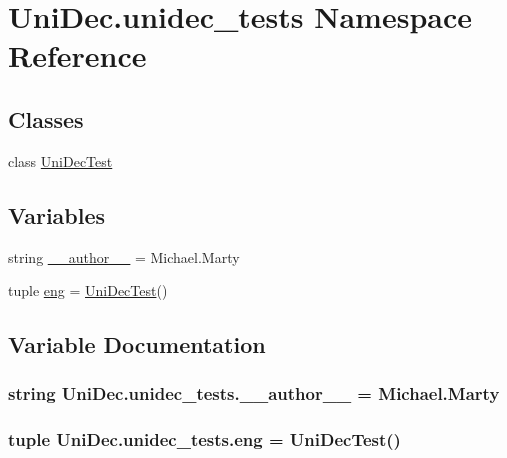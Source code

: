 \hypertarget{namespace_uni_dec_1_1unidec__tests}{}\section{Uni\+Dec.\+unidec\+\_\+tests Namespace Reference}
\label{namespace_uni_dec_1_1unidec__tests}
\subsection*{Classes}
\begin{DoxyCompactItemize}
\item 
class \hyperlink{class_uni_dec_1_1unidec__tests_1_1_uni_dec_test}{Uni\+Dec\+Test}
\end{DoxyCompactItemize}
\subsection*{Variables}
\begin{DoxyCompactItemize}
\item 
string \hyperlink{namespace_uni_dec_1_1unidec__tests_aa5af8d24527df9f71be79db84e1bf8b1}{\+\_\+\+\_\+author\+\_\+\+\_\+} = \textquotesingle{}Michael.\+Marty\textquotesingle{}
\item 
tuple \hyperlink{namespace_uni_dec_1_1unidec__tests_a3bc1a351c1c2477741d0c48d38276a52}{eng} = \hyperlink{class_uni_dec_1_1unidec__tests_1_1_uni_dec_test}{Uni\+Dec\+Test}()
\end{DoxyCompactItemize}


\subsection{Variable Documentation}
\hypertarget{namespace_uni_dec_1_1unidec__tests_aa5af8d24527df9f71be79db84e1bf8b1}{}
\subsubsection[{\+\_\+\+\_\+author\+\_\+\+\_\+}]{\setlength{\rightskip}{0pt plus 5cm}string Uni\+Dec.\+unidec\+\_\+tests.\+\_\+\+\_\+author\+\_\+\+\_\+ = \textquotesingle{}Michael.\+Marty\textquotesingle{}}\label{namespace_uni_dec_1_1unidec__tests_aa5af8d24527df9f71be79db84e1bf8b1}
\hypertarget{namespace_uni_dec_1_1unidec__tests_a3bc1a351c1c2477741d0c48d38276a52}{}
\subsubsection[{eng}]{\setlength{\rightskip}{0pt plus 5cm}tuple Uni\+Dec.\+unidec\+\_\+tests.\+eng = {\bf Uni\+Dec\+Test}()}\label{namespace_uni_dec_1_1unidec__tests_a3bc1a351c1c2477741d0c48d38276a52}
